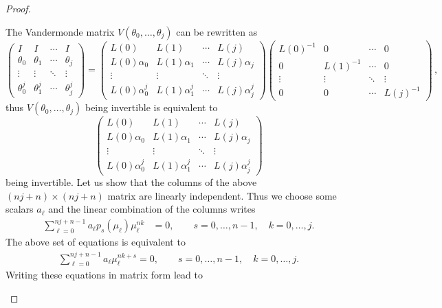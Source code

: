 \documentclass[a4paper,reqno]{amsart}
\theoremstyle{definition}
\numberwithin{equation}{section}
\begin{document}
\begin{proof}
\begin{enumerate}
The Vandermonde matrix $V(\theta_0,\ldots,\theta_j)$ can be rewritten as
\begin{equation}
\begin{pmatrix}I & I & \cdots & I \\
\theta_0 & \theta_1& \cdots & \theta_j \\
\vdots & \vdots & \ddots & \vdots \\
\theta_0^j &\theta_1^j & \cdots & \theta_j^j
\end{pmatrix}=\begin{pmatrix}L(0) & L(1)& \cdots & L(j) \\
L(0)\alpha_0 & L(1)\alpha_1& \cdots & L(j)\alpha_j \\
\vdots & \vdots & \ddots & \vdots \\
L(0)\alpha_0^j &L(1)\alpha_1^j & \cdots & L(j)\alpha_j^j
\end{pmatrix}\begin{pmatrix}
L(0)^{-1}&0&\cdots&0\\
0& L(1)^{-1}&\cdots&0\\
\vdots&\vdots&\ddots&\vdots\\
0&0&\cdots&L(j)^{-1}
\end{pmatrix}\,,
\end{equation}
thus $V(\theta_0,\ldots,\theta_j)$ being invertible is equivalent to 
\begin{equation}
\begin{pmatrix}L(0) & L(1)& \cdots & L(j) \\
L(0)\alpha_0 & L(1)\alpha_1& \cdots & L(j)\alpha_j \\
\vdots & \vdots & \ddots & \vdots \\
L(0)\alpha_0^j &L(1)\alpha_1^j & \cdots & L(j)\alpha_j^j
\end{pmatrix}
\end{equation}
being invertible. Let us show that the columns of the above $(nj+n)\times (nj+n)$ matrix are linearly independent. Thus we choose some scalars $a_\ell$ and the linear combination of the columns writes
\begin{align}
\sum_{\ell=0}^{nj+n-1}a_\ell p_s(\mu_\ell)\mu_\ell^{nk}&=0, \qquad s=0,\ldots,n-1,  \quad k=0,\ldots,j.
\end{align}
The above set of equations is equivalent to 
\begin{align}
\sum_{\ell=0}^{nj+n-1}a_\ell\mu_{\ell}^{nk+s}=0, \qquad s=0,\ldots,n-1,\quad k=0,\ldots,j.
\end{align}
Writing these equations in matrix form lead to 
\begin{equation}

\end{equation}
\end{enumerate}
\end{proof}
\end{document}
